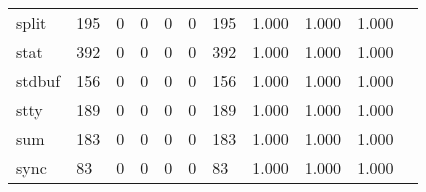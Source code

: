 \begin{longtable}{lp{1.2cm}p{1.2cm}p{1.2cm}p{1.2cm}p{1.2cm}p{1.2cm}p{1.2cm}p{1.2cm}p{1.2cm}p{1.2cm}}
split     &                                   195 &                                                  0 &                                                  0 &                                                  0 &                                                  0 &                                                195 &                                              1.000 &                                              1.000 &                                              1.000 \\
stat      &                                   392 &                                                  0 &                                                  0 &                                                  0 &                                                  0 &                                                392 &                                              1.000 &                                              1.000 &                                              1.000 \\
stdbuf    &                                   156 &                                                  0 &                                                  0 &                                                  0 &                                                  0 &                                                156 &                                              1.000 &                                              1.000 &                                              1.000 \\
stty      &                                   189 &                                                  0 &                                                  0 &                                                  0 &                                                  0 &                                                189 &                                              1.000 &                                              1.000 &                                              1.000 \\
sum       &                                   183 &                                                  0 &                                                  0 &                                                  0 &                                                  0 &                                                183 &                                              1.000 &                                              1.000 &                                              1.000 \\
sync      &                                    83 &                                                  0 &                                                  0 &                                                  0 &                                                  0 &                                                 83 &                                              1.000 &                                              1.000 &                                              1.000 \\

\end{longtable}
